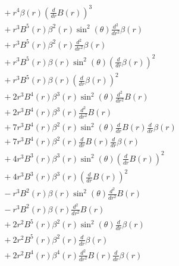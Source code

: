 \documentclass[11pt,a4paper]{article}
\begin{document}
\begin{align*}
  &\quad + r^{4} \beta{\left(r \right)} \left(\frac{d}{d r} B{\left(r \right)}\right)^{3} \\
  &\quad + r^{3} B^{5}{\left(r \right)} \beta^{2}{\left(r \right)} \sin^{2}{\left(\theta \right)} \frac{d^{2}}{d r^{2}} \beta{\left(r \right)} \\
  &\quad + r^{3} B^{5}{\left(r \right)} \beta^{2}{\left(r \right)} \frac{d^{2}}{d r^{2}} \beta{\left(r \right)} \\
  &\quad + r^{3} B^{5}{\left(r \right)} \beta{\left(r \right)} \sin^{2}{\left(\theta \right)} \left(\frac{d}{d r} \beta{\left(r \right)}\right)^{2} \\
  &\quad + r^{3} B^{5}{\left(r \right)} \beta{\left(r \right)} \left(\frac{d}{d r} \beta{\left(r \right)}\right)^{2} \\
  &\quad + 2 r^{3} B^{4}{\left(r \right)} \beta^{3}{\left(r \right)} \sin^{2}{\left(\theta \right)} \frac{d^{2}}{d r^{2}} B{\left(r \right)} \\
  &\quad + 2 r^{3} B^{4}{\left(r \right)} \beta^{3}{\left(r \right)} \frac{d^{2}}{d r^{2}} B{\left(r \right)} \\
  &\quad + 7 r^{3} B^{4}{\left(r \right)} \beta^{2}{\left(r \right)} \sin^{2}{\left(\theta \right)} \frac{d}{d r} B{\left(r \right)} \frac{d}{d r} \beta{\left(r \right)} \\
  &\quad + 7 r^{3} B^{4}{\left(r \right)} \beta^{2}{\left(r \right)} \frac{d}{d r} B{\left(r \right)} \frac{d}{d r} \beta{\left(r \right)} \\
  &\quad + 4 r^{3} B^{3}{\left(r \right)} \beta^{3}{\left(r \right)} \sin^{2}{\left(\theta \right)} \left(\frac{d}{d r} B{\left(r \right)}\right)^{2} \\
  &\quad + 4 r^{3} B^{3}{\left(r \right)} \beta^{3}{\left(r \right)} \left(\frac{d}{d r} B{\left(r \right)}\right)^{2} \\
  &\quad - r^{3} B^{2}{\left(r \right)} \beta{\left(r \right)} \sin^{2}{\left(\theta \right)} \frac{d^{2}}{d r^{2}} B{\left(r \right)} \\
  &\quad - r^{3} B^{2}{\left(r \right)} \beta{\left(r \right)} \frac{d^{2}}{d r^{2}} B{\left(r \right)} \\
  &\quad + 2 r^{2} B^{5}{\left(r \right)} \beta^{2}{\left(r \right)} \sin^{2}{\left(\theta \right)} \frac{d}{d r} \beta{\left(r \right)} \\
  &\quad + 2 r^{2} B^{5}{\left(r \right)} \beta^{2}{\left(r \right)} \frac{d}{d r} \beta{\left(r \right)} \\
  &\quad + 2 r^{2} B^{4}{\left(r \right)} \beta^{4}{\left(r \right)} \frac{d^{2}}{d r^{2}} B{\left(r \right)} \frac{d}{d r} \beta{\left(r \right)} \\

\end{align*}
\end{document}
